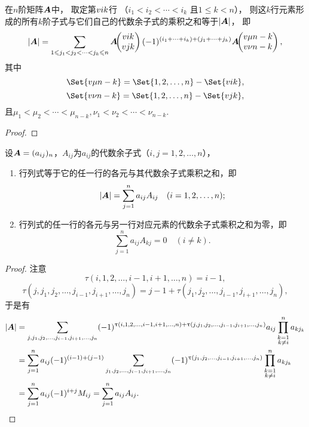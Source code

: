 \begin{theorem}[拉普拉斯定理]\label{theorem:行列式.拉普拉斯定理}
在\(n\)阶矩阵\(\boldsymbol{A}\)中，
取定第\(v{i}{k}\)行
（\(i_1<i_2<\dotsb<i_k\)
且\(1 \leqslant k < n\)），
则这\(k\)行元素形成的所有\(k\)阶子式与它们自己的代数余子式的乘积之和等于\(\abs{\boldsymbol{A}}\)，%
即\begin{equation}
	\abs{\boldsymbol{A}} =
	\sum\limits_{1 \leqslant j_1 < j_2 < \dotsb < j_k \leqslant n}
	\boldsymbol{A}\kern-3.8pt\begin{pmatrix}
		v{i}{k} \\
		v{j}{k}
	\end{pmatrix}
	(-1)^{(i_1+\dotsb+i_k)+(j_1+\dotsb+j_k)}
	\boldsymbol{A}\kern-3.8pt\begin{pmatrix}
		v{\mu}{n-k} \\
		v{\nu}{n-k}
	\end{pmatrix},
\end{equation}
其中\[
	\Set{ \v{\mu}{n-k} } = \Set{ 1,2,\dotsc,n } - \Set{ \v{i}{k} },
\]\[
	\Set{ \v{\nu}{n-k} } = \Set{ 1,2,\dotsc,n } - \Set{ \v{j}{k} },
\]
且\(\mu_1<\mu_2<\dotsb<\mu_{n-k},
\nu_1<\nu_2<\dotsb<\nu_{n-k}\).
\begin{proof}

\end{proof}
\end{theorem}

\begin{theorem}
设\(\boldsymbol{A}=(a_{ij})_n\)，\(A_{ij}\)为\(a_{ij}\)的代数余子式（\(i,j=1,2,\dotsc,n\)），%
\begin{enumerate}
\item 行列式等于它的任一行的各元与其代数余子式乘积之和，即\[
\abs{\boldsymbol{A}}=\sum\limits_{j=1}^n a_{ij} A_{ij}
\quad(i=1,2,\dotsc,n);
\]

\item 行列式的任一行的各元与另一行对应元素的代数余子式乘积之和为零，即\[
\sum\limits_{j=1}^n a_{ij} A_{kj} = 0 \quad (i \neq k).
\]
\end{enumerate}
\begin{proof}
注意\[
\tau(i,1,2,\dotsc,i-1,i+1,\dotsc,n) = i-1,
\]\[
\tau(j,j_1,j_2,\dotsc,j_{i-1},j_{i+1},\dotsc,j_n) = j-1+\tau(j_1,j_2,\dotsc,j_{i-1},j_{i+1},\dotsc,j_n),
\]于是有\begin{align*}
	\abs{\boldsymbol{A}}
	&= \sum\limits_{j,j_1,j_2,\dotsc,j_{i-1},j_{i+1},\dotsc,j_n}
		(-1)^{\uptau(i,1,2,\dotsc,i-1,i+1,\dotsc,n) + \uptau(j,j_1,j_2,\dotsc,j_{i-1},j_{i+1},\dotsc,j_n)}
		a_{ij} \prod\limits_{\substack{k=1 \\ k \neq i}}^n a_{k j_k} \\
	&= \sum\limits_{j=1}^n a_{ij} (-1)^{(i-1)+(j-1)}
		\sum\limits_{j_1,j_2,\dotsc,j_{i-1},j_{i+1},\dotsc,j_n}
			(-1)^{\uptau(j_1,j_2,\dotsc,j_{i-1},j_{i+1},\dotsc,j_n)}
				\prod\limits_{\substack{k=1 \\ k \neq i}}^n a_{k j_k} \\
	&= \sum\limits_{j=1}^n a_{ij} (-1)^{i+j} M_{ij}
	= \sum\limits_{j=1}^n a_{ij} A_{ij}.
	\qedhere
\end{align*}
\end{proof}
\end{theorem}

